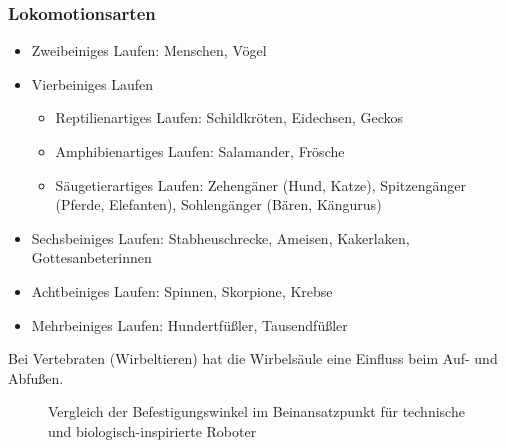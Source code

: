 \subsubsection{Lokomotionsarten} %
\begin{itemize}
	\item Zweibeiniges Laufen: Menschen, Vögel
	\item Vierbeiniges Laufen
	\begin{itemize}
		\item Reptilienartiges Laufen: Schildkröten, Eidechsen, Geckos
		\item Amphibienartiges Laufen: Salamander, Frösche
		\item Säugetierartiges Laufen: Zehengäner (Hund, Katze), Spitzengänger (Pferde, Elefanten), Sohlengänger (Bären, Kängurus)
	\end{itemize}
	\item Sechsbeiniges Laufen: Stabheuschrecke, Ameisen, Kakerlaken, Gottesanbeterinnen
	\item Achtbeiniges Laufen: Spinnen, Skorpione, Krebse
	\item Mehrbeiniges Laufen: Hundertfüßler, Tausendfüßler
\end{itemize}

Bei Vertebraten (Wirbeltieren) hat die Wirbelsäule eine Einfluss beim Auf- und Abfußen.

\begin{figure}
\centering
{}\par\medskip
{}
	\caption{Vergleich der Befestigungswinkel im Beinansatzpunkt für technische und biologisch-inspirierte Roboter}
\end{figure}

